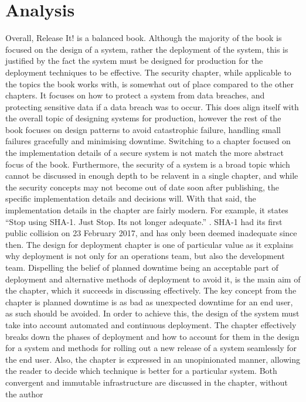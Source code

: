\documentclass[11pt]{article}
\begin{document}
\section{Analysis}
Overall, Release It! is a balanced book.
Although the majority of the book is focused on the design of a system, rather the deployment of 
the system, this is justified by the fact the system must be designed for production for the 
deployment techniques to be effective.
The security chapter, while applicable to the topics the book works with, is somewhat out of place
compared to the other chapters.
It focuses on how to protect a system from data breaches, and protecting sensitive data if a data
breach was to occur.
This does align itself with the overall topic of designing systems for production, however the 
rest of the book focuses on design patterns to avoid catastrophic failure, handling small failures
gracefully and minimising downtime.
Switching to a chapter focused on the implementation details of a secure system is not match the 
more abstract focus of the book.
Furthermore, the security of a system is a broad topic which cannot be discussed in enough depth to
be relavent in a single chapter, and while the security concepts may not become out of date soon 
after publishing, the specific implementation details and decisions will.
With that said, the implementation details in the chapter are fairly modern.
For example, it states ``Stop using SHA-1. Just Stop. Its not longer adequate.'' 
\cite[p.~226]{release}.
SHA-1 had its first public collision on 23 February 2017, and has only been deemed inadequate since
then.
The design for deployment chapter is one of particular value as it explains why deployment is not
only for an operations team, but also the development team.
Dispelling the belief of planned downtime being an acceptable part of deployment and alternative
methods of deployment to avoid it, is the main aim of the chapter, which it succeeds in discussing
effectively.
The key concept from the chapter is planned downtime is as bad as unexpected downtime for an end
user, as such should be avoided.
In order to achieve this, the design of the system must take into account automated and continuous
deployment.
The chapter effectively breaks down the phases of deployment and how to account for them in the
design for a system and methods for rolling out a new release of a system seamlessly for the end
user.
Also, the chapter is expressed in an unopinionated manner, allowing the reader to decide which
technique is better for a particular system.
Both convergent and immutable infrastructure are discussed in the chapter, without the author
\end{document}

